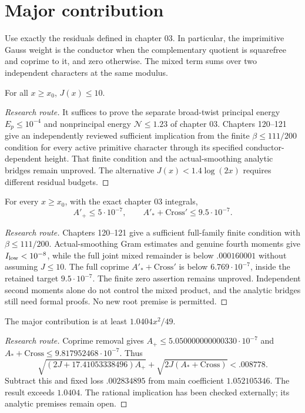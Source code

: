 \chapter{Major contribution}
Use exactly the residuals defined in chapter 03. In particular, the
imprimitive Gauss weight is the conductor when the complementary quotient
is squarefree and coprime to it, and zero otherwise. The mixed term sums
over two independent characters at the same modulus.

\begin{theorem}\label{upperj}\notready
For all $x\ge x_0$, $J(x)\le10$.
\end{theorem}
\begin{proof}[Research route]
It suffices to prove the separate broad-twist principal energy
$E_p\le10^{-4}$ and nonprincipal energy $\mathcal N\le1.23$ of chapter 03.
Chapters 120--121 give an independently reviewed sufficient implication
from the finite $\beta\le111/200$ condition for every active primitive
character through its specified conductor-dependent height. That finite
condition and the actual-smoothing analytic bridges remain unproved.
The alternative $J(x)<1.4\log(2x)$ requires different residual budgets.
\end{proof}

\begin{theorem}\label{residual}\notready
For every $x\ge x_0$, with the exact chapter 03 integrals,
\[A'_+\le5\cdot10^{-7},\qquad A'_*+\mathrm{Cross}'\le9.5\cdot10^{-7}.\]
\end{theorem}
\begin{proof}[Research route]
Chapters 120--121 give a sufficient full-family finite condition with
$\beta\le111/200$. Actual-smoothing Gram estimates and genuine fourth
moments give $I_{\rm low}<10^{-8}$, while the full joint mixed remainder
is below $.000160001$ without assuming $J\le10$.
The full coprime $A'_*+\mathrm{Cross}'$ is below $6.769\cdot10^{-7}$,
inside the retained target $9.5\cdot10^{-7}$.
The finite zero assertion remains unproved. Independent second moments
alone do not control the mixed product, and the analytic bridges still
need formal proofs. No new root premise is permitted.
\end{proof}

\begin{theorem}\label{major}\notready
The major contribution is at least $1.0404x^2/49$.
\end{theorem}
\begin{proof}[Research route]
Coprime removal gives $A_+\le5.050000000000330\cdot10^{-7}$ and
$A_*+\mathrm{Cross}\le9.817952468\cdot10^{-7}$. Thus
\[\sqrt{(2J+17.41053338496)A_+}+
\sqrt{2J(A_*+\mathrm{Cross})}<.008778.\]
Subtract this and fixed loss $.002834895$ from main coefficient
$1.052105346$. The result exceeds $1.0404$. The rational implication has
been checked externally; its analytic premises remain open.
\end{proof}

